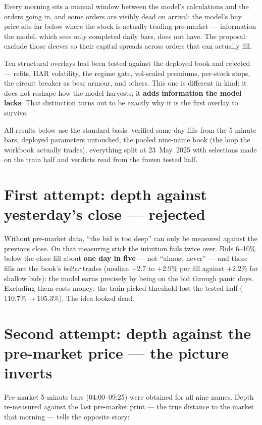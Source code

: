 \documentclass[11pt,a4paper]{article}
\begin{document}
Every morning sits a manual window between the model's calculations and the
orders going in, and some orders are visibly dead on arrival: the model's buy
price sits far below where the stock is actually trading pre-market ---
information the model, which sees only completed daily bars, does not have. The
proposal: exclude those sleeves so their capital spreads across orders that can
actually fill.

Ten structural overlays had been tested against the deployed book and rejected
--- refits, HAR volatility, the regime gate, vol-scaled premiums, per-stock
stops, the circuit breaker as bear armour, and others. This one is different in
kind: it does not reshape how the model harvests; it \textbf{adds information
the model lacks}. That distinction turns out to be exactly why it is the first
overlay to survive.

All results below use the standard basis: verified same-day fills from the
5-minute bars, deployed parameters untouched, the pooled nine-name book (the
loop the workbook actually trades), everything split at 23~May~2025 with
selections made on the train half and verdicts read from the frozen tested
half.

\section{First attempt: depth against yesterday's close --- rejected}

Without pre-market data, ``the bid is too deep'' can only be measured against
the previous close. On that measuring stick the intuition fails twice over.
Bids 6--10\% below the close fill about \textbf{one day in five} --- not
``almost never'' --- and those fills are the book's \emph{better} trades
(median $+2.7$ to $+2.9\%$ per fill against $+2.2\%$ for shallow bids): the
model earns precisely by being on the bid through panic days. Excluding them
costs money: the train-picked threshold lost the tested half ($110.7\%
\rightarrow 105.3\%$). The idea looked dead.

\section{Second attempt: depth against the pre-market price --- the picture inverts}

Pre-market 5-minute bars (04:00--09:25) were obtained for all nine names. Depth
re-measured against the last pre-market print --- the true distance to the
market that morning --- tells the opposite story:
\end{document}
